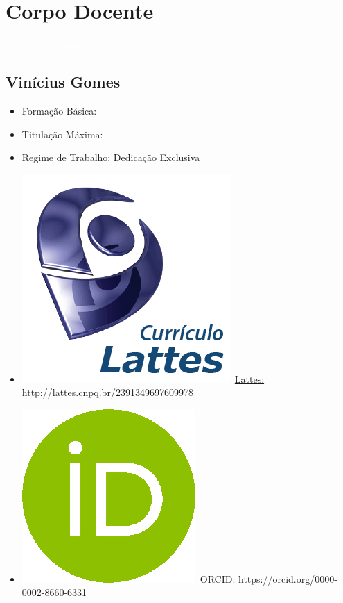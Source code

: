 \documentclass[11pt,fleqn]{book} %
\begin{document}
\chapter{Corpo Docente}\label{docentes}
\vspace{6em}
\begin{flushright}
	\textit{\textcolor{white}{Um bonita citação...}}
\end{flushright}
\vspace{12em}


\section{Vinícius Gomes}\label{ViniciusGomes}
\begin{itemize}
	\item Formação Básica: 
	\item Titulação Máxima: 
	\item Regime de Trabalho: Dedicação Exclusiva
	\item \includegraphics[scale=.03]{Pictures/lattes}~\href{http://lattes.cnpq.br/2391349697609978}{Lattes: http://lattes.cnpq.br/2391349697609978}
	\item \includegraphics[scale=.15]{Pictures/orcid}~\href{https://orcid.org/0000-0002-8660-6331}{ORCID: https://orcid.org/0000-0002-8660-6331}
\end{itemize}
\end{document}
